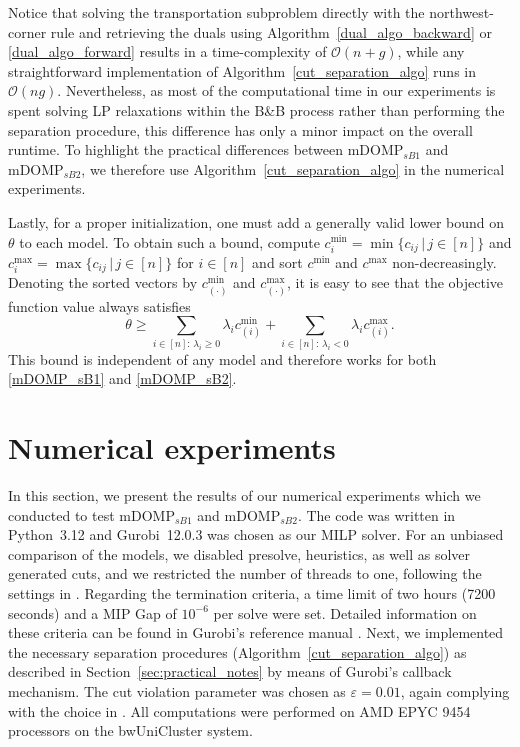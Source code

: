 \documentclass[letterpaper]{article}
\begin{document}
Notice that solving the transportation subproblem directly with the northwest-corner rule and retrieving the duals using Algorithm~\ref{dual_algo_backward} or \ref{dual_algo_forward} results in a time-complexity of $\mathcal{O}(n+g)$, while any straightforward implementation of Algorithm~\ref{cut_separation_algo} runs in $\mathcal{O}(ng)$. Nevertheless, as most of the computational time in our experiments is spent solving LP relaxations within the B\&B process rather than performing the separation procedure, this difference has only a minor impact on the overall runtime. To highlight the practical differences between $\text{mDOMP}_{sB1}$ and $\text{mDOMP}_{sB2}$, we therefore use Algorithm~\ref{cut_separation_algo} in the numerical experiments.

Lastly, for a proper initialization, one must add a generally valid lower bound on $\theta$ to each model. To obtain such a bound, compute $c^{\min}_i = \min\{c_{ij} \, | \, j \in [n]\}$ and $c^{\max}_i = \max\{c_{ij} \, | \, j \in [n]\}$ for $i \in [n]$ and sort $c^{\min}$ and $c^{\max}$ non-decreasingly. Denoting the sorted vectors by $c^{\min}_{(\cdot)}$ and $c^{\max}_{(\cdot)}$, it is easy to see that the objective function value always satisfies 
\begin{equation*}
    \theta \geq \sum_{i \in [n]: \, \lambda_{i} \geq 0} \lambda_i c^{\min}_{(i)} + \sum_{i \in [n]: \, \lambda_{i} < 0} \lambda_i c^{\max}_{(i)}.
\end{equation*}
This bound is independent of any model and therefore works for both \eqref{mDOMP_sB1} and \eqref{mDOMP_sB2}.


\section{Numerical experiments}\label{sec:numerical_experiments}
In this section, we present the results of our numerical experiments which we conducted to test $\text{mDOMP}_{sB1}$ and $\text{mDOMP}_{sB2}$. The code was written in Python~3.12 and Gurobi~12.0.3 \citep{gurobi} was chosen as our MILP solver. For an unbiased comparison of the models, we disabled presolve, heuristics, as well as solver generated cuts, and we restricted the number of threads to one, following the settings in \cite{ljubic_benders_2024}. Regarding the termination criteria, a time limit of two hours (7200 seconds) and a MIP Gap of $10^{-6}$ per solve were set. Detailed information on these criteria can be found in Gurobi's reference manual \citep{gurobi}. Next, we implemented the necessary separation procedures (Algorithm~\ref{cut_separation_algo}) as described in Section~\ref{sec:practical_notes} by means of Gurobi's callback mechanism. The cut violation parameter was chosen as $\varepsilon = 0.01$, again complying with the choice in \cite{ljubic_benders_2024}. All computations were performed on AMD EPYC 9454 processors on the bwUniCluster system.
\end{document}
